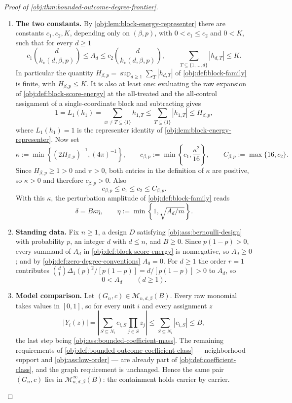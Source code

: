 \begin{proof}[Proof of \cref{obj:thm:bounded-outcome-degree-frontier}]
\begin{enumerate}
\item \textbf{The two constants.}
By \cref{obj:lem:block-energy-representer} there are constants \(c_1,c_2,K\),
depending only on \((\beta,p)\), with \(0<c_1\le c_2\) and \(0<K\), such that for
every \(d\ge 1\)
\[
c_1\binom{d}{k_\star(d,\beta,p)}
\le A_d
\le
c_2\binom{d}{k_\star(d,\beta,p)},
\qquad
\sum_{T\subseteq\{1,\ldots,d\}}|h_{d,T}|\le K .
\]
In particular the quantity \(H_{\beta,p}=\sup_{d\ge1}\sum_T|h_{d,T}|\) of
\cref{obj:def:block-family} is finite, with \(H_{\beta,p}\le K\).  It is also at
least one: evaluating the raw expansion of \cref{obj:def:block-score-energy} at
the all-treated and the all-control assignment of a single-coordinate block and
subtracting gives
\[
1=L_1(h_1)=\sum_{\varnothing\ne T\subseteq\{1\}}h_{1,T}
\le\sum_{T\subseteq\{1\}}|h_{1,T}|\le H_{\beta,p},
\]
where \(L_1(h_1)=1\) is the representer identity of
\cref{obj:lem:block-energy-representer}. Now set
\[
\kappa
:=
\min\!\left\{(2H_{\beta,p})^{-1},(4\pi)^{-1}\right\},
\qquad
c_{\beta,p}
:=
\min\!\left\{c_1,\frac{\kappa^2}{16}\right\},
\qquad
C_{\beta,p}
:=
\max\{16,c_2\}.
\]
Since \(H_{\beta,p}\ge 1>0\) and \(\pi>0\), both entries in the definition of
\(\kappa\) are positive, so \(\kappa>0\) and therefore \(c_{\beta,p}>0\).  Also
\[
c_{\beta,p}\le c_1\le c_2\le C_{\beta,p}.
\]
With this \(\kappa\), the perturbation amplitude of \cref{obj:def:block-family}
reads
\[
\delta
=
B\kappa\eta,
\qquad
\eta:=\min\!\left\{1,\sqrt{A_d/m}\right\}.
\]

\item \textbf{Standing data.}
Fix \(n\ge 1\), a design \(D\) satisfying \cref{obj:ass:bernoulli-design} with
probability \(p\), an integer \(d\) with \(d\le n\), and \(B\ge 0\).  Since
\(p(1-p)>0\), every summand of \(A_d\) in \cref{obj:def:block-score-energy} is
nonnegative, so \(A_d\ge0\); and by \cref{obj:def:zero-degree-conventions}
\(A_0=0\).  For \(d\ge1\) the order \(r=1\) contributes
\(\binom d1\Delta_1(p)^2/[p(1-p)]=d/[p(1-p)]>0\) to \(A_d\), so
\[
0<A_d\qquad (d\ge 1).
\]

\item \textbf{Model comparison.}
Let \((G_n,c)\in\mathcal M_{n,d,\beta}(B)\).  Every raw monomial takes values in
\([0,1]\), so for every unit \(i\) and every assignment \(z\)
\[
|Y_i(z)|
=
\left|\sum_{S\subseteq N_i}c_{i,S}\prod_{j\in S}z_j\right|
\le
\sum_{S\subseteq N_i}|c_{i,S}|
\le B,
\]
the last step being \cref{obj:ass:bounded-coefficient-mass}.  The remaining
requirements of \cref{obj:def:bounded-outcome-coefficient-class} — neighborhood
support and \cref{obj:ass:low-order} — are already part of
\cref{obj:def:coefficient-class}, and the graph requirement is unchanged.  Hence
the same pair \((G_n,c)\) lies in \(\mathcal M_{n,d,\beta}^{\infty}(B)\): the
containment holds carrier by carrier.


\end{enumerate}
\end{proof}
